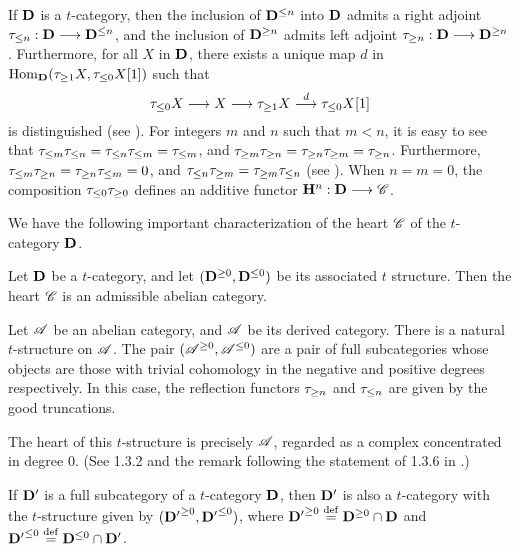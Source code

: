 If $\DCat$ is a $t$-category, then the inclusion of $\DCat^{\leq 
n}$ into $\DCat$ admits a right adjoint $\gltrunc{n}: \DCat \to 
\DCat^{\leq n}$, and the inclusion of $\DCat^{\geq n}$ admits left 
adjoint $\ggtrunc{n}: \DCat \to \DCat^{\geq n}$. Furthermore, for 
all $X$ in $\DCat$, there exists a unique map $d$ in 
$\hom_{\DCat}(\ggtrunc{1}X, \gltrunc{0}X[1])$ such that
\[
\gltrunc{0} X \to X \to \ggtrunc{1} X \stackrel{d}{\to} \gltrunc{0}X[1]
\]
is distinguished (see \cite[1.3.3]{BBD}). For integers $m$ and $n$ 
such that $m < n$, it is easy to see that $\gltrunc{m} \gltrunc{n} =
\gltrunc{n}\gltrunc{m} = \gltrunc{m}$, and $\ggtrunc{m} 
\ggtrunc{n} = \ggtrunc{n} \ggtrunc{m} = \ggtrunc{n}$. Furthermore, 
$\gltrunc{m} \ggtrunc{n} = \ggtrunc{n} \gltrunc{m} = 0$, and
$\gltrunc{n} \ggtrunc{m} = \ggtrunc{m} \gltrunc{n}$ 
(see \cite[1.3.5]{BBD}). When $n = m = 0$, the composition
$\gltrunc{0} \ggtrunc{0}$ defines an additive functor 
$\HH^n : \DCat \to \Cat{C}$.

We have the following important characterization of the heart
$\Cat{C}$ of the $t$-category $\DCat$.

\begin{thm}\label{thm_heart_is_abel_cat}
Let $\DCat$ be a $t$-category, and let $(\DCat^{\geq 0}, 
\DCat^{\leq 0})$ be its associated $t$ structure. Then the heart 
$\Cat{C}$ is an admissible abelian category. 
\end{thm}

\begin{ex}\label{ex_DA_t_struct}
Let $\Cat{A}$ be an abelian category, and $\DCat[\Cat{A}]$ be its
derived category. There is a natural $t$-structure on 
$\DCat[\Cat{A}]$. The pair $(\DCat[\Cat{A}]^{\geq 0}, 
\DCat[\Cat{A}]^{\leq 0})$ are a pair of full subcategories whose
objects are those with trivial cohomology in the negative and 
positive degrees respectively. In this case, the reflection 
functors $\ggtrunc{n}$ and $\gltrunc{n}$ are given by the good
truncations. 

The heart of this $t$-structure is precisely $\Cat{A}$, regarded
as a complex concentrated in degree $0$. (See 1.3.2 and the remark
following the statement of 1.3.6 in \cite{BBD}.)
\end{ex}

\begin{ex}
If $\DCat'$ is a full subcategory of a $t$-category $\DCat$, then
$\DCat'$ is also a $t$-category with the $t$-structure given by
$({\DCat'}^{\geq 0}, {\DCat'}^{\leq 0})$, where ${\DCat'}^{\geq 0} 
\defeq \DCat^{\geq 0} \cap \DCat$ and ${\DCat'}^{\leq 0} \defeq 
\DCat^{\leq 0} \cap \DCat'$. 
\end{ex}

